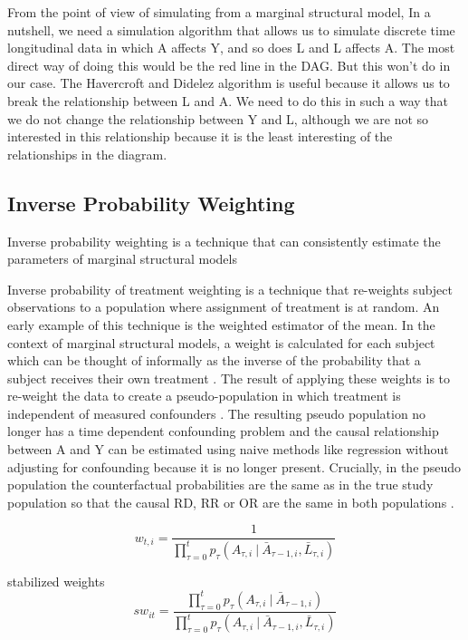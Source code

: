 \documentclass[11pt]{article}
\begin{document}
From the point of view of simulating from a marginal structural model,
In a nutshell, we need a simulation algorithm that allows us to simulate
discrete time longitudinal data in which A affects Y, and so does L and
L affects A. The most direct way of doing this would be the red line in
the DAG. But this won't do in our case. The Havercroft and Didelez
algorithm is useful because it allows us to break the relationship
between L and A. We need to do this in such a way that we do not change
the relationship between Y and L, although we are not so interested in
this relationship because it is the least interesting of the
relationships in the diagram.

    \subsection{Inverse Probability
Weighting}\label{inverse-probability-weighting}

Inverse probability weighting is a technique that can consistently
estimate the parameters of marginal structural models \citet{Robins2000}

Inverse probability of treatment weighting is a technique that
re-weights subject observations to a population where assignment of
treatment is at random. An early example of this technique is the
\citet{Horovitz1952} weighted estimator of the mean. In the context of
marginal structural models, a weight is calculated for each subject
which can be thought of informally as the inverse of the probability
that a subject receives their own treatment \citet{Robins2000}. The
result of applying these weights is to re-weight the data to create a
pseudo-population in which treatment is independent of measured
confounders \citet{Cole2008}. The resulting pseudo population no longer
has a time dependent confounding problem and the causal relationship
between A and Y can be estimated using naive methods like regression
without adjusting for confounding because it is no longer present.
Crucially, in the pseudo population the counterfactual probabilities are
the same as in the true study population so that the causal RD, RR or OR
are the same in both populations \citet{Robins2000}.

\[w_{t,i} = \frac{1}{\prod_{\tau=0} ^ t p_{\tau} (A_{\tau, i}\ |\ \bar A_{\tau-1, i}, \bar L_{\tau, i})}\]

stabilized weights
\[sw_{it} = \frac{\prod_{\tau=0} ^ t p_{\tau} (A_{\tau, i}\ |\ \bar A_{\tau-1, i})} {\prod_{\tau=0} ^ t p_{\tau} (A_{\tau, i}\ |\ \bar A_{\tau-1, i}, \bar L_{\tau, i})}\]
\end{document}
